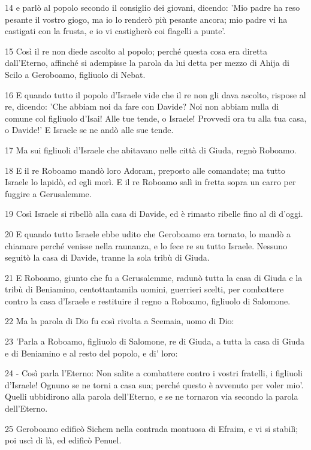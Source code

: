 \par 14 e parlò al popolo secondo il consiglio dei giovani, dicendo: 'Mio padre ha reso pesante il vostro giogo, ma io lo renderò più pesante ancora; mio padre vi ha castigati con la frusta, e io vi castigherò coi flagelli a punte'.
\par 15 Così il re non diede ascolto al popolo; perché questa cosa era diretta dall'Eterno, affinché si adempisse la parola da lui detta per mezzo di Ahija di Scilo a Geroboamo, figliuolo di Nebat.
\par 16 E quando tutto il popolo d'Israele vide che il re non gli dava ascolto, rispose al re, dicendo: 'Che abbiam noi da fare con Davide? Noi non abbiam nulla di comune col figliuolo d'Isai! Alle tue tende, o Israele! Provvedi ora tu alla tua casa, o Davide!' E Israele se ne andò alle sue tende.
\par 17 Ma sui figliuoli d'Israele che abitavano nelle città di Giuda, regnò Roboamo.
\par 18 E il re Roboamo mandò loro Adoram, preposto alle comandate; ma tutto Israele lo lapidò, ed egli morì. E il re Roboamo salì in fretta sopra un carro per fuggire a Gerusalemme.
\par 19 Così Israele si ribellò alla casa di Davide, ed è rimasto ribelle fino al dì d'oggi.
\par 20 E quando tutto Israele ebbe udito che Geroboamo era tornato, lo mandò a chiamare perché venisse nella raunanza, e lo fece re su tutto Israele. Nessuno seguitò la casa di Davide, tranne la sola tribù di Giuda.
\par 21 E Roboamo, giunto che fu a Gerusalemme, radunò tutta la casa di Giuda e la tribù di Beniamino, centottantamila uomini, guerrieri scelti, per combattere contro la casa d'Israele e restituire il regno a Roboamo, figliuolo di Salomone.
\par 22 Ma la parola di Dio fu così rivolta a Scemaia, uomo di Dio:
\par 23 'Parla a Roboamo, figliuolo di Salomone, re di Giuda, a tutta la casa di Giuda e di Beniamino e al resto del popolo, e di' loro:
\par 24 - Così parla l'Eterno: Non salite a combattere contro i vostri fratelli, i figliuoli d'Israele! Ognuno se ne torni a casa sua; perché questo è avvenuto per voler mio'. Quelli ubbidirono alla parola dell'Eterno, e se ne tornaron via secondo la parola dell'Eterno.
\par 25 Geroboamo edificò Sichem nella contrada montuosa di Efraim, e vi si stabilì; poi uscì di là, ed edificò Penuel.
